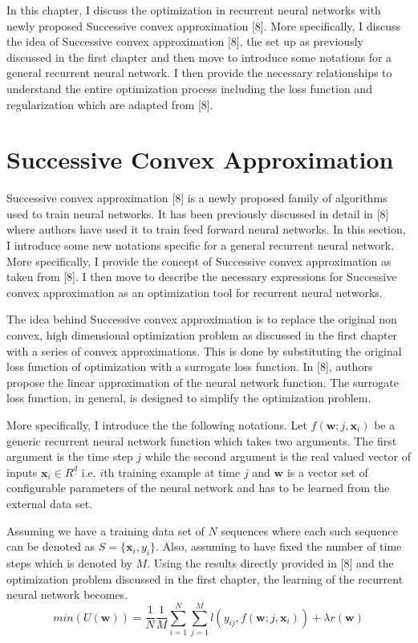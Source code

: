 In this chapter, I discuss the optimization in recurrent neural networks with newly proposed Successive convex approximation [8]. More specifically, I discuss the idea of Successive convex approximation [8], the set up as previously discussed in the first chapter and then move to introduce some notations for a general recurrent neural network. I then provide the necessary relationships to understand the entire optimization process including the loss function and regularization which are adapted from [8].    

\section {Successive Convex Approximation}

Successive convex approximation [8] is a newly proposed family of algorithms used to train neural networks. It has been previously discussed in detail in [8] where authors have used it to train feed forward neural networks. In this section, I introduce some new notations specific for a general recurrent neural network. More specifically, I provide the concept of Successive convex approximation as taken from [8]. I then move to describe the necessary expressions for Successive convex approximation as an optimization tool for recurrent neural networks.

The idea behind Successive convex approximation is to replace the original non convex, high dimensional optimization problem as discussed in the first chapter with a series of convex approximations. This is done by substituting the original loss function of optimization with a surrogate loss function. In [8], authors propose the linear approximation of the neural network function. The surrogate loss function, in general, is designed to simplify the optimization problem.
 
More specifically, I introduce the the following notations. Let $f(\textbf{w};j,\textbf{x}_i)$ be a generic recurrent neural network function which takes two arguments. The first argument is the time step $j$ while the second argument is the real valued vector of inputs $\textbf{x}_i\in R^{d}$ i.e. $i$th training example at time $j$ and $\textbf{w}$ is a vector set of configurable parameters of the neural network and has to be learned from the external data set.  

Assuming we have a training data set of $N$ sequences where each such sequence can be denoted as 
$S=\lbrace \textbf{x}_i,y_i \rbrace$. Also, assuming to have fixed the number of time steps which is denoted by $M$. Using the results directly provided in [8] and the optimization problem discussed in the first chapter, the learning of the recurrent neural network becomes.
\begin{equation}
min(U(\textbf{w}))=\frac{1}{N}\frac{1}{M} \sum_{i=1}^{N} \sum_{j=1}^{M} l(y_{ij},f(\textbf{w};j,\textbf{x}_i))+\lambda r(\textbf{w})
\end{equation} 

